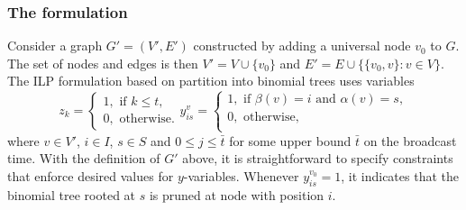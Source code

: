 \subsubsection{The formulation}
Consider a graph $G'=(V',E')$ constructed  by adding a universal node $v_0$ to $G$.
The set of nodes and edges is then $V'=V\cup \{v_0\}$ and $E'=E\cup\{\{v_0,v\}:v\in V\}$.
The ILP formulation based on partition into binomial trees uses variables
$$
z_{k}=
\begin{cases}
1, \text{ if } k\leq t,\\
0, \text{ otherwise}.
\end{cases}
y_{is}^v=
\begin{cases}
1, \text{ if } \beta(v)=i \text{ and } \alpha(v)=s,\\
0, \text{ otherwise},\\
\end{cases}
$$
where $v\in V'$, $i\in I$, $s\in S$ and $0\leq j\leq \bar{t}$ for some upper bound $\bar{t}$ on the broadcast time.
With the definition of $G'$ above, it is straightforward to specify constraints that enforce desired values for $y$-variables.
Whenever $y_{is}^{v_0}=1$, it indicates that the binomial tree rooted at $s$ is pruned at node with position $i$.
